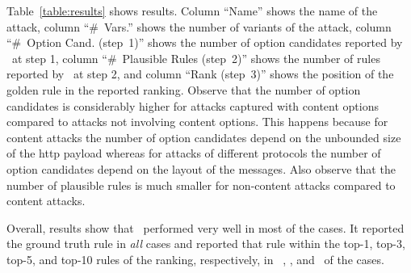 \documentclass[conference]{IEEEtran}
\begin{document}


Table~\ref{table:results} shows results. Column ``Name'' shows the
name of the attack, column ``\#~Vars.'' shows the number of variants
of the attack, column ``\#~Option Cand. (step~1)'' shows the number of
option candidates reported by \tname\ at step 1, column ``\#~Plausible
Rules (step~2)'' shows the number of rules reported by \tname\ at step
2, and column ``Rank (step~3)'' shows the position of the golden rule
in the reported ranking. Observe that the number of option candidates
is considerably higher for attacks captured with content options
compared to attacks not involving content options. This happens
because for content attacks the number of option candidates depend on
the unbounded size of the http payload whereas for attacks of
different protocols the number of option candidates depend on the
layout of the messages. Also observe that the number of plausible
rules is much smaller for non-content attacks compared to content
attacks.


Overall, results show that \tname\ performed very well in most of the
cases. It reported the ground truth rule in \emph{all} cases and
reported that rule within the top-1, top-3, top-5, and top-10 rules of
the ranking, respectively, in \percTopOneRanking\,
\percTopThreeRanking, \percTopFiveRanking, and \percTopTenRanking\ of
the cases.



\end{document}
